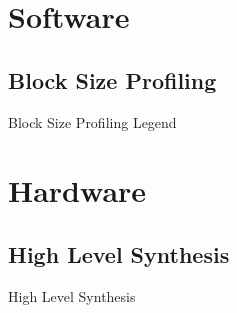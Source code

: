 \section{Software}

\subsection{Block Size Profiling}
\begin{frame}{Block Size Profiling Legend}
    \centering
    
\end{frame}

\section{Hardware}

\subsection{High Level Synthesis}
\begin{frame}{High Level Synthesis}
\end{frame}
